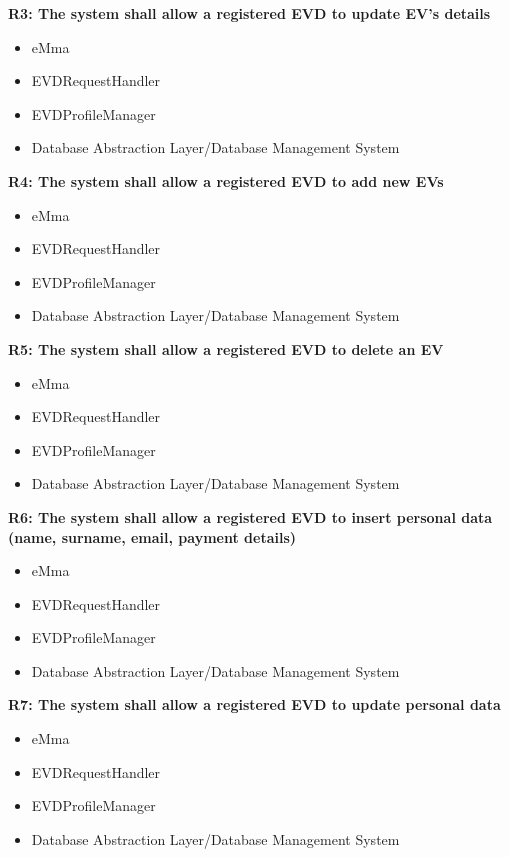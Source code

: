 \textbf{R3: The system shall allow a registered EVD to update EV’s details}
\begin{itemize}
	\item eMma
	\item EVDRequestHandler
	\item EVDProfileManager
    \item Database Abstraction Layer/Database Management System
\end{itemize}

\textbf{R4: The system shall allow a registered EVD to add new EVs}
\begin{itemize}
	\item eMma
	\item EVDRequestHandler
	\item EVDProfileManager
    \item Database Abstraction Layer/Database Management System
\end{itemize}

\textbf{R5: The system shall allow a registered EVD to delete an EV}
\begin{itemize}
	\item eMma
	\item EVDRequestHandler
	\item EVDProfileManager
    \item Database Abstraction Layer/Database Management System
\end{itemize}

\textbf{R6: The system shall allow a registered EVD to insert personal data (name, surname, email, payment details)}
\begin{itemize}
	\item eMma
	\item EVDRequestHandler
	\item EVDProfileManager
    \item Database Abstraction Layer/Database Management System
\end{itemize}

\textbf{R7: The system shall allow a registered EVD to update personal data}
\begin{itemize}
	\item eMma
	\item EVDRequestHandler
	\item EVDProfileManager
    \item Database Abstraction Layer/Database Management System
\end{itemize}

